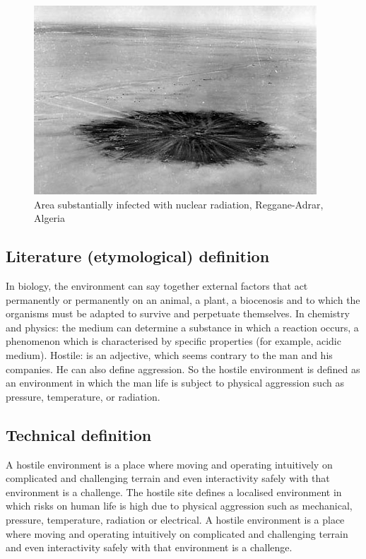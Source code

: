 \documentclass[Afour,sageh,times]{sagej}
\begin{document}
\begin{figure}
    \centering
    \includegraphics[scale=15]{RagganeNuclear.png}
    \caption{Area substantially infected with nuclear radiation, Reggane-Adrar, Algeria}
    \label{fig:Reggane}
\end{figure}

\subsection{Literature (etymological) definition}
In biology, the environment can say together external factors that act permanently or permanently on an animal, a plant, a biocenosis and to which the organisms must be adapted to survive and perpetuate themselves.
In chemistry and physics: the medium can determine a substance in which a reaction occurs, a phenomenon which is characterised by specific properties (for example, acidic medium).
Hostile: is an adjective, which seems contrary to the man and his companies. He can also define aggression.
So the hostile environment is defined as an environment in which the man life is subject to physical aggression such as pressure, temperature, or radiation.

\subsection{Technical definition}
A hostile environment is a place where moving and operating intuitively on complicated and challenging terrain and even interactivity safely with that environment is a challenge.
The hostile site defines a localised environment in which risks on human life is high due to physical aggression such as mechanical, pressure, temperature, radiation or electrical.
A hostile environment is a place where moving and operating intuitively on complicated and challenging terrain and even interactivity safely with that environment is a challenge.
\end{document}

